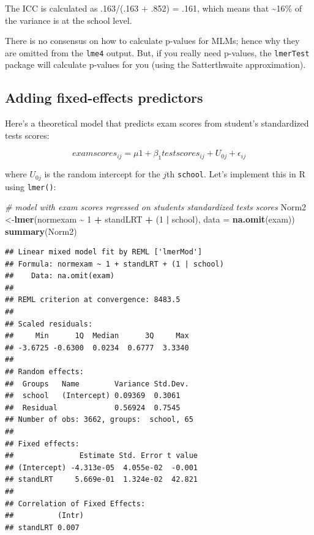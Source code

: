 \documentclass[
]{book}
\newenvironment{Shaded}{\begin{snugshade}}{\end{snugshade}}
\newcommand{\CommentTok}[1]{\textcolor[rgb]{0.56,0.35,0.01}{\textit{#1}}}
\newcommand{\DataTypeTok}[1]{\textcolor[rgb]{0.13,0.29,0.53}{#1}}
\newcommand{\DecValTok}[1]{\textcolor[rgb]{0.00,0.00,0.81}{#1}}
\newcommand{\KeywordTok}[1]{\textcolor[rgb]{0.13,0.29,0.53}{\textbf{#1}}}
\newcommand{\NormalTok}[1]{#1}
\newcommand{\OperatorTok}[1]{\textcolor[rgb]{0.81,0.36,0.00}{\textbf{#1}}}
\newcommand{\StringTok}[1]{\textcolor[rgb]{0.31,0.60,0.02}{#1}}
\begin{document}
The ICC is calculated as .163/(.163 + .852) = .161, which means that \textasciitilde16\% of the variance is at the school level.

There is no consensus on how to calculate p-values for MLMs; hence why they are omitted from the \texttt{lme4} output. But, if you really need p-values, the \texttt{lmerTest} package will calculate p-values for you (using the Satterthwaite approximation).

\hypertarget{adding-fixed-effects-predictors}{%
\subsection{Adding fixed-effects predictors}\label{adding-fixed-effects-predictors}}

Here's a theoretical model that predicts exam scores from student's standardized tests scores:

\[
examscores_{ij} = \mu1 + \beta_1testscores_{ij} + U_{0j} + \epsilon_{ij}
\]

where \(U_{0j}\) is the random intercept for the \(j\)th \texttt{school}. Let's implement this in R using \texttt{lmer()}:

\begin{Shaded}
\begin{Highlighting}[]
  \CommentTok{\# model with exam scores regressed on student\textquotesingle{}s standardized tests scores}
\NormalTok{  Norm2 \textless{}{-}}\KeywordTok{lmer}\NormalTok{(normexam }\OperatorTok{\textasciitilde{}}\StringTok{ }\DecValTok{1} \OperatorTok{+}\StringTok{ }\NormalTok{standLRT }\OperatorTok{+}\StringTok{ }\NormalTok{(}\DecValTok{1} \OperatorTok{|}\StringTok{ }\NormalTok{school),}
               \DataTypeTok{data =} \KeywordTok{na.omit}\NormalTok{(exam)) }
  \KeywordTok{summary}\NormalTok{(Norm2) }
\end{Highlighting}
\end{Shaded}

\begin{verbatim}
## Linear mixed model fit by REML ['lmerMod']
## Formula: normexam ~ 1 + standLRT + (1 | school)
##    Data: na.omit(exam)
## 
## REML criterion at convergence: 8483.5
## 
## Scaled residuals: 
##     Min      1Q  Median      3Q     Max 
## -3.6725 -0.6300  0.0234  0.6777  3.3340 
## 
## Random effects:
##  Groups   Name        Variance Std.Dev.
##  school   (Intercept) 0.09369  0.3061  
##  Residual             0.56924  0.7545  
## Number of obs: 3662, groups:  school, 65
## 
## Fixed effects:
##               Estimate Std. Error t value
## (Intercept) -4.313e-05  4.055e-02  -0.001
## standLRT     5.669e-01  1.324e-02  42.821
## 
## Correlation of Fixed Effects:
##          (Intr)
## standLRT 0.007
\end{verbatim}
\end{document}
